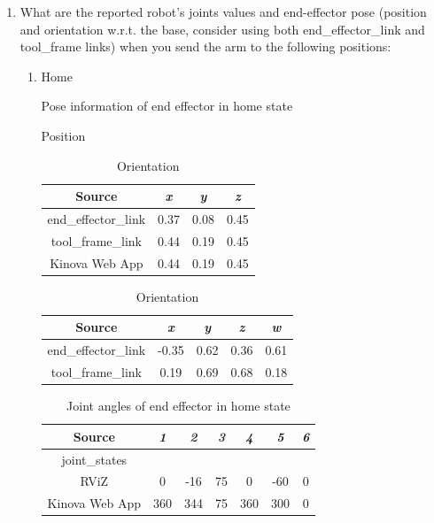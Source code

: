 \documentclass[12pt]{article}
\begin{document}
\begin{enumerate}
    \item What are the reported robot’s joints values and end-effector pose (position and orientation w.r.t. the base, consider using both end\_effector\_link and tool\_frame links) when you send the arm to the following positions:
    \begin{enumerate}
        \item Home
        
        \begin{table}[H]
            \caption{Pose information of end effector in home state}
            \begin{subtable}{.4\linewidth}
                \centering
                \caption{Position}
                \begin{tabular}{cccc}
                    \toprule
                    Source & \textit{x} & \textit{y} & \textit{z} \\\midrule
                    end\_effector\_link & 0.37 & 0.08 & 0.45 \\
                    tool\_frame\_link & 0.44 & 0.19 & 0.45 \\
                    Kinova Web App & 0.44 & 0.19 & 0.45 \\\bottomrule
                \end{tabular}
            \end{subtable}
            \hfill
            \begin{subtable}{.52\linewidth}
                \centering
                \caption{Orientation}
                \begin{tabular}{ccccc}
                    \toprule
                    Source & \textit{x} & \textit{y} & \textit{z} & \textit{w} \\\midrule
                    end\_effector\_link & -0.35 & 0.62 & 0.36 & 0.61 \\
                    tool\_frame\_link & 0.19 & 0.69 & 0.68 & 0.18 \\\bottomrule
                \end{tabular}
            \end{subtable}
        \end{table}
        \vspace{-10pt}
        \begin{table}[H]
            \centering
            \caption{Joint angles of end effector in home state}
            \begin{tabular}{ccccccc}
            \toprule
            Source & \textit{1} & \textit{2} & \textit{3} & \textit{4} & \textit{5} & \textit{6} \\\midrule
            joint\_states & & & & & & \\
            RViZ & 0 & -16 & 75 & 0 & -60 & 0 \\
            Kinova Web App & 360 & 344 & 75 & 360 & 300 & 0 \\\bottomrule
            \end{tabular}
        \end{table}


\end{enumerate}
\end{enumerate}
\end{document}
